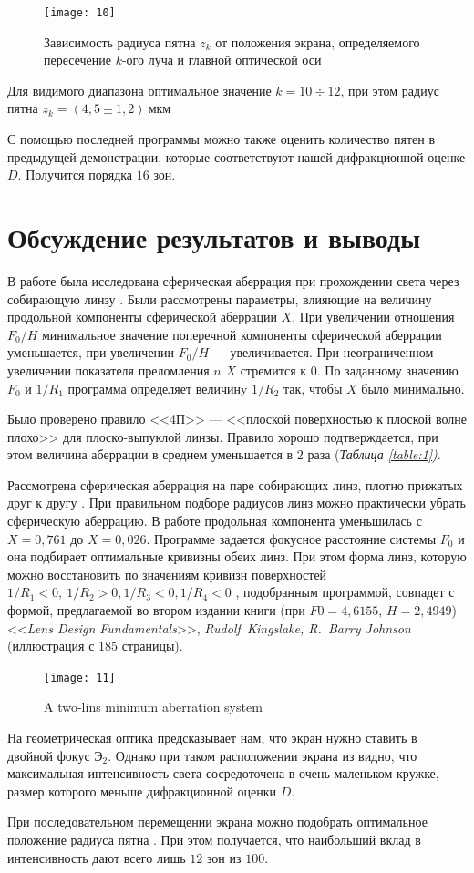 \documentclass[a4paper, 12pt]{article}
\begin{document}
\begin{figure}[H]
    \texttt{[image: 10]} 
    \caption{Зависимость радиуса пятна $z_k$ от положения экрана,
    определяемого пересечение $k$-ого луча и главной оптической оси}
    \label{fig:10}
\end{figure}

Для видимого диапазона оптимальное значение $k = 10\div 12$, при этом
радиус пятна $z_k = (4,5 \pm 1,2)\ \text{мкм}$

С помощью последней программы можно также оценить
количество пятен в предыдущей демонстрации, которые соответствуют
нашей
дифракционной оценке $D$. Получится порядка $16$ зон.

\section{Обсуждение результатов и выводы}
В работе была исследована сферическая аберрация при прохождении света
через собирающую линзу . Были рассмотрены
параметры, влияющие на величину продольной компоненты сферической
аберрации $X$. При увеличении отношения $F_0/H$ минимальное значение
поперечной компоненты сферической аберрации уменьшается, при
увеличении $F_0/H$ --- увеличивается. При неограниченном увеличении
показателя преломления $n$ $X$ стремится к $0$. По заданному значению
$F_0$ и $1/R_1$ программа определяет величинy $1/R_2$ так, чтобы $X$ было
минимально.

Было проверено правило <<4П>> --- <<плоской поверхностью к плоской
волне плохо>> для плоско-выпуклой линзы. Правило хорошо подтверждается,
при этом величина аберрации в среднем уменьшается в $2$ раза (\textsl{Таблица
\ref{table:1})}.

Рассмотрена сферическая аберрация на паре собирающих линз, плотно
прижатых друг к другу . При правильном подборе радиусов
линз можно практически убрать сферическую аберрацию.
В работе продольная компонента уменьшилась с $X=0,761$
до $X = 0,026$. Программе задается фокусное расстояние системы
$F_0$ и она подбирает
оптимальные кривизны обеих линз. При этом форма линз, которую можно
восстановить по значениям кривизн поверхностей $1/R_1<0 ,\ 1/R_2>0,
1/R_3<0, 1/R_4<0$ , подобранным
программой, совпадет с формой, предлагаемой во втором издании книги
(при $F0 = 4,6155$, $H = 2,4949$)
<<\textit{Lens Design Fundamentals}>>, \textit{Rudolf~Kingslake,
R.~Barry Johnson} (иллюстрация с 185 страницы).

\begin{figure}[H]
    \texttt{[image: 11]} 
    \caption{A two-lins minimum aberration system}
    \label{fig:11}
\end{figure}


На  геометрическая оптика предсказывает нам, что экран
нужно ставить в двойной фокус $\text{Э}_2$. Однако при таком
расположении экрана из  видно, что максимальная
интенсивность света сосредоточена в очень маленьком кружке, 
размер которого меньше дифракционной оценки $D$.

При последовательном перемещении экрана можно подобрать оптимальное положение радиуса
пятна . При этом получается, что наибольший вклад в
интенсивность дают всего лишь $12$ зон из $100$. 
\end{document}
